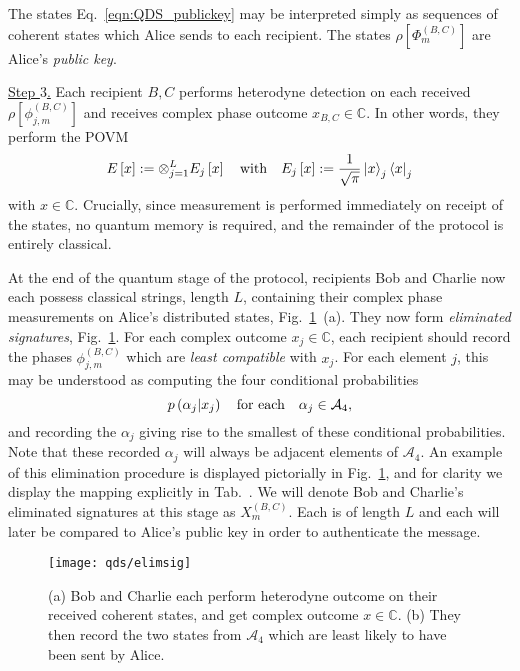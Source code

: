 The states Eq.~\ref{eqn:QDS_publickey} may be interpreted simply as sequences of coherent states which Alice sends to each recipient. The states $\rho\left[\Phi_m^{\left(B, C\right)}\right]$ are Alice's \emph{public key}. 
\par
\noindent \underline{Step $3$.} Each recipient $B, C$ performs heterodyne detection on each received $\rho\left[\phi_{j, m}^{\left(B, C\right)}\right]$ and receives complex phase outcome $x_{B,C}\in\mathbb{C}$. In other words, they perform the POVM
\begin{equation}
E\left[x\right] := \otimes_{j=1}^L E_j\left[x\right] \qq{with} E_j\left[x\right] := \frac{1}{\sqrt{\pi}} \ket{x}_j\bra{x}_j
\end{equation}
with $x \in \mathbb{C}$. Crucially, since measurement is performed immediately on receipt of the states, no quantum memory is required, and the remainder of the protocol is entirely classical.

At the end of the quantum stage of the protocol, recipients Bob and Charlie now each possess classical strings, length $L$, containing their complex phase measurements on Alice's distributed states, Fig.~\ref{fig:elimsig}~(a). They now form \emph{eliminated signatures}, Fig.~\ref{fig:elimsig}. For each complex outcome $x_j\in\mathbb{C}$, each recipient should record the phases $\phi_{j, m}^{\left(B, C\right)}$ which are \emph{least compatible} with $x_j$. For each element $j$, this may be understood as computing the four conditional probabilities 
\begin{equation}
p\left(\alpha_j | x_j\right) \qq{for each} \alpha_j \in \mathcal{A}_4,
\end{equation}
and recording the $\alpha_j$ giving rise to the smallest of these conditional probabilities. Note that these recorded $\alpha_j$ will always be adjacent elements of $\mathcal{A}_4$. An example of this elimination procedure is displayed pictorially in Fig.~\ref{fig:elimsig}, and for clarity we display the mapping explicitly in Tab.~.  We will denote Bob and Charlie's eliminated signatures at this stage as $X_m^{\left(B, C\right)}$. Each is of length $L$ and each will later be compared to Alice's public key in order to authenticate the message. 

\begin{figure}[htp]
\centering
\texttt{[image: qds/elimsig]}
\caption{\label{fig:elimsig} (a) Bob and Charlie each perform heterodyne outcome on their received coherent states, and get complex outcome $x \in \mathbb{C}$. (b) They then record the two states from $\mathcal{A}_4$ which are least likely to have been sent by Alice.}
\end{figure}

